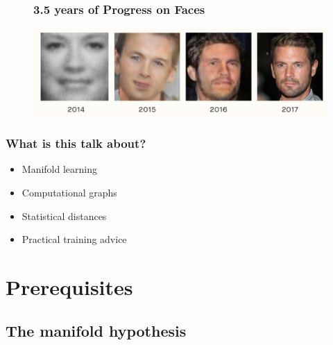 \documentclass{Bredelebeamer}
\begin{document}
\begin{frame}
\begin{figure}[h!]
\frametitle{3.5 years of Progress on Faces}
	\centering
	\href{https://www.youtube.com/watch?v=XOxxPcy5Gr4}{\includegraphics[width=\textwidth]{gan_progress.png}}
\end{figure}
\end{frame}
\begin{frame}
\frametitle{What is this talk about?}
\begin{itemize}
	\item Manifold learning
	\item Computational graphs
	\item Statistical distances
	\item Practical training advice
\end{itemize}

\end{frame}


\section{Prerequisites}
\subsection{The manifold hypothesis}
\end{document}
